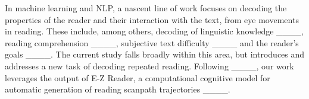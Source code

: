 In machine learning and NLP, a nascent line of work focuses on decoding the properties of the reader and their interaction with the text, from eye movements in reading. These include, among others, decoding of linguistic knowledge ____, reading comprehension ____, subjective text difficulty ____ and the reader's goals ____. The current study falls broadly within this area, but introduces and addresses a new task of decoding repeated reading. %
Following ____, our work leverages the output of \mbox{E-Z} Reader, a computational cognitive model for automatic generation of reading scanpath trajectories ____.